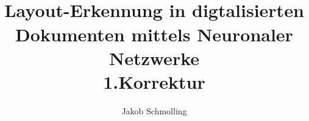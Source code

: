\newcommand{\jc}[1]{\texttt{#1}}
\newsavebox{\titleimage}

\author{Jakob Schmolling}
\title[]{
\vfill
\usebox{\titleimage}\\
\noindent
\huge{Layout-Erkennung in digtalisierten Dokumenten mittels Neuronaler Netzwerke}\\
\noindent\Large{1.Korrektur}\\
}


